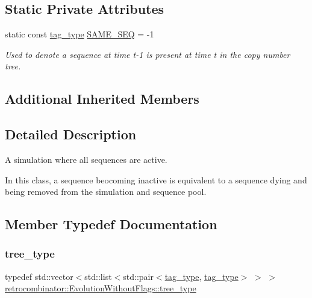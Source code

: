 \subsection*{Static Private Attributes}
\begin{DoxyCompactItemize}
\item 
\mbox{\label{classretrocombinator_1_1EvolutionWithoutFlags_a25081461cff1a2b2cc6a613c71383778}} 
static const \hyperlink{namespaceretrocombinator_afd7c6eb4293e8c4d12827609a9a34b9b}{tag\+\_\+type} \hyperlink{classretrocombinator_1_1EvolutionWithoutFlags_a25081461cff1a2b2cc6a613c71383778}{S\+A\+M\+E\+\_\+\+S\+EQ} = -\/1
\begin{DoxyCompactList}\small\item\em Used to denote a sequence at time {\itshape t-\/1} is present at time {\itshape t} in the copy number tree. \end{DoxyCompactList}\end{DoxyCompactItemize}
\subsection*{Additional Inherited Members}


\subsection{Detailed Description}
A simulation where all sequences are active. 

In this class, a sequence beocoming inactive is equivalent to a sequence dying and being removed from the simulation and sequence pool. 

\subsection{Member Typedef Documentation}
\mbox{\label{classretrocombinator_1_1EvolutionWithoutFlags_ac6bd9b8af2b258bf76aae5b62ef78327}} 
\subsubsection{\texorpdfstring{tree\+\_\+type}{tree\_type}}
{\footnotesize\ttfamily typedef std\+::vector$<$std\+::list$<$std\+::pair$<$\hyperlink{namespaceretrocombinator_afd7c6eb4293e8c4d12827609a9a34b9b}{tag\+\_\+type}, \hyperlink{namespaceretrocombinator_afd7c6eb4293e8c4d12827609a9a34b9b}{tag\+\_\+type}$>$ $>$ $>$ \hyperlink{classretrocombinator_1_1EvolutionWithoutFlags_ac6bd9b8af2b258bf76aae5b62ef78327}{retrocombinator\+::\+Evolution\+Without\+Flags\+::tree\+\_\+type}}



